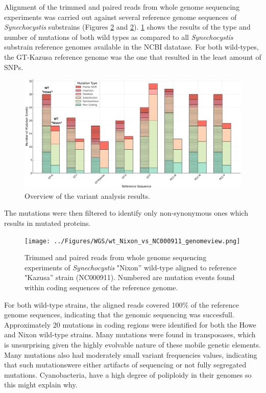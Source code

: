 \documentclass[12pt]{article}
\begin{document}
Alignment of the trimmed and paired reads from whole genome sequencing experiments was carried out against several reference genome sequences of \textit{Synechocystis} substrains (Figures \ref{fig:WTN_NC000911} and \ref{fig:WTN_NC000911}). \ref{fig:SNPs} shows the results of the type and number of mutations of both wild types as compared to all \textit{Synechocystis} substrain reference genomes available in the NCBI datatase. For both wild-types, the GT-Kazusa reference genome was the one that resulted in the least amount of SNPs.

\begin{figure}[H]
    \centering
    \includegraphics[width=\hsize]{../Figures/MV_adaptation/mutation_events_plot.png}
    \caption{Overview of the variant analysis results.}
    \label{fig:SNPs}
\end{figure}

The mutations were then filtered to identify only non-synonymous ones which results in mutated proteins. 

\begin{figure}[H]
    \centering
    \texttt{[image: ../Figures/WGS/wt\_Nixon\_vs\_NC000911\_genomeview.png]}
    \caption{Trimmed and paired reads from whole genome sequencing experiments of \textit{Synechocystis} "Nixon'' wild-type aligned to reference "Kazusa'' strain (NC000911). Numbered are mutation events found within coding sequences of the reference genome.}
    \label{fig:WTN_NC000911}
\end{figure}

For both wild-type strains, the aligned reads covered 100$\%$ of the reference genome sequences, indicating that the genomic sequencing was succesfull.
Approximately 20 mutations in coding regions were identified for both the Howe and Nixon wild-type strains. Many mutations were found in transposases, which is unsurprising given the highly evolvable nature of these mobile genetic elements. Many mutations also had moderately small variant frequencies values, indicating that such mutationswere either artifacts of sequencing or not fully segregated mutations. Cyanobacteria, have a high degree of poliploidy in their genomes so this might explain why.
\end{document}
